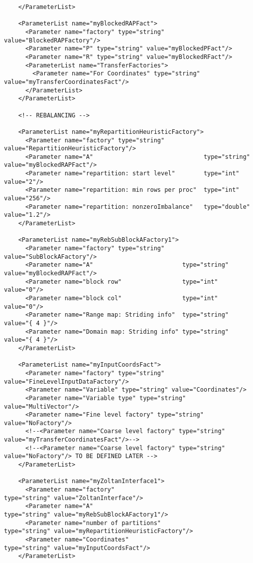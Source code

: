 \documentclass[10pt,fleqn]{book}
\begin{document}
\begin{lstlisting}
    </ParameterList>

    <ParameterList name="myBlockedRAPFact">
      <Parameter name="factory" type="string" value="BlockedRAPFactory"/>
      <Parameter name="P" type="string" value="myBlockedPFact"/>
      <Parameter name="R" type="string" value="myBlockedRFact"/>
      <ParameterList name="TransferFactories">
        <Parameter name="For Coordinates" type="string" value="myTransferCoordinatesFact"/>
      </ParameterList>
    </ParameterList>

    <!-- REBALANCING -->
    
    <ParameterList name="myRepartitionHeuristicFactory">
      <Parameter name="factory" type="string" value="RepartitionHeuristicFactory"/>
      <Parameter name="A"                               type="string"  value="myBlockedRAPFact"/>
      <Parameter name="repartition: start level"        type="int"     value="2"/>
      <Parameter name="repartition: min rows per proc"  type="int"     value="256"/>
      <Parameter name="repartition: nonzeroImbalance"   type="double"  value="1.2"/>
    </ParameterList> 
    
    <ParameterList name="myRebSubBlockAFactory1">
      <Parameter name="factory" type="string" value="SubBlockAFactory"/>
      <Parameter name="A"                         type="string"  value="myBlockedRAPFact"/>
      <Parameter name="block row"                 type="int"     value="0"/>
      <Parameter name="block col"                 type="int"     value="0"/>
      <Parameter name="Range map: Striding info"  type="string"  value="{ 4 }"/>
      <Parameter name="Domain map: Striding info" type="string"  value="{ 4 }"/>
    </ParameterList>

    <ParameterList name="myInputCoordsFact">
      <Parameter name="factory" type="string" value="FineLevelInputDataFactory"/>      
      <Parameter name="Variable" type="string" value="Coordinates"/>  
      <Parameter name="Variable type" type="string" value="MultiVector"/>  
      <Parameter name="Fine level factory" type="string" value="NoFactory"/>  
      <!--<Parameter name="Coarse level factory" type="string" value="myTransferCoordinatesFact"/>-->
      <!--<Parameter name="Coarse level factory" type="string" value="NoFactory"/> TO BE DEFINED LATER -->
    </ParameterList>    
    
    <ParameterList name="myZoltanInterface1">
      <Parameter name="factory"                             type="string" value="ZoltanInterface"/>
      <Parameter name="A"                                   type="string" value="myRebSubBlockAFactory1"/>
      <Parameter name="number of partitions"                type="string" value="myRepartitionHeuristicFactory"/>
      <Parameter name="Coordinates"                         type="string" value="myInputCoordsFact"/>
    </ParameterList>
    

\end{lstlisting}
\end{document}
